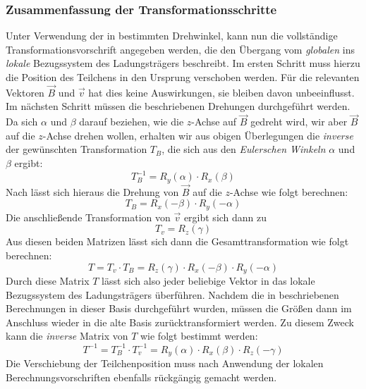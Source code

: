 \subsubsection{Zusammenfassung der Transformationsschritte}
Unter Verwendung der in  bestimmten Drehwinkel, kann nun die vollst\"andige Transformationsvorschrift angegeben
werden, die den \"Ubergang vom \textit{globalen} ins \textit{lokale} Bezugssystem des Ladungstr\"agers beschreibt. Im ersten Schritt
muss hierzu die Position des Teilchens in den Ursprung verschoben werden. F\"ur die relevanten Vektoren \(\vec{B}\) und \(\vec{v}\)
hat dies keine Auswirkungen, sie bleiben davon unbeeinflusst. Im n\"achsten Schritt m\"ussen die beschriebenen Drehungen
durchgef\"uhrt werden. Da sich \(\alpha\) und \(\beta\) darauf beziehen, wie die \(z\)-Achse auf \(\vec{B}\) gedreht wird, wir aber
\(\vec{B}\) auf die \(z\)-Achse drehen wollen, erhalten wir aus obigen \"Uberlegungen die \textit{inverse} der gew\"unschten
Transformation \(T_B\), die sich aus den \textit{Eulerschen Winkeln} \(\alpha\) und \(\beta\) ergibt:
\begin{equation}
  T_B^{-1} = R_y(\alpha) \cdot R_x(\beta)
\end{equation}
Nach  l\"asst sich hieraus die Drehung von \(\vec{B}\) auf die \(z\)-Achse wie folgt berechnen:
\begin{equation}
  T_B = R_x(-\beta) \cdot R_y(-\alpha)
\end{equation}
Die anschlie{\ss}ende Transformation von \(\vec{v}\) ergibt sich dann zu
\begin{equation}
  T_v = R_z(\gamma)
\end{equation}
Aus diesen beiden Matrizen l\"asst sich dann die Gesamttransformation wie folgt berechnen:
\begin{equation}
  T = T_v \cdot T_B = R_z(\gamma) \cdot R_x(-\beta) \cdot R_y(-\alpha)
\end{equation}
Durch diese Matrix \(T\) l\"asst sich also jeder beliebige Vektor in das lokale Bezugssystem des Ladungstr\"agers \"uberf\"uhren.
Nachdem die in  beschriebenen Berechnungen in dieser Basis durchgef\"uhrt wurden,
m\"ussen die Gr\"o{\ss}en dann im
Anschluss wieder in die alte Basis zur\"ucktransformiert werden. Zu diesem Zweck kann die \textit{inverse} Matrix von \(T\)
wie folgt bestimmt werden:
\begin{equation}
  T^{-1} = T_B^{-1} \cdot T_v^{-1} = R_y(\alpha) \cdot R_x(\beta) \cdot R_z(-\gamma)
\end{equation}
Die Verschiebung der Teilchenposition muss nach Anwendung der lokalen Berechnungsvorschriften ebenfalls r\"uckg\"angig gemacht werden.

